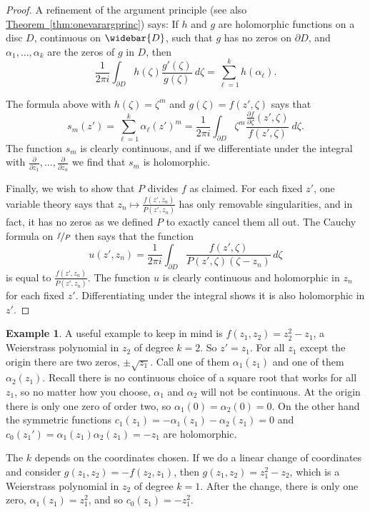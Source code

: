 \documentclass[12pt,openany]{book}
\theoremstyle{plain}
\theoremstyle{remark}
\theoremstyle{definition}
\theoremstyle{exercise}
\theoremstyle{example}
\newtheorem{example}[thm]{Example}
\newcommand{\thmref}[1]{\hyperref[#1]{Theorem~\ref*{#1}}}
\begin{document}
\begin{proof}
A refinement of the argument principle (see also \thmref{thm:onevarargprinc}) says:
If $h$ and $g$ are
holomorphic functions on a disc $D$, continuous on $\widebar{D}$,
such that $g$ has no zeros on $\partial D$, and $\alpha_1,\ldots,\alpha_k$
are the zeros of $g$ in $D$, then
\begin{equation*}
\frac{1}{2 \pi i}
\int_{\partial D} h(\zeta) \frac{g'(\zeta)}{g(\zeta)} ~d\zeta
= \sum_{\ell=1}^k h(\alpha_\ell) .
\end{equation*}

The formula above with $h(\zeta) = \zeta^m$ and $g(\zeta)=f(z',\zeta)$ says that
\begin{equation*}
s_m(z') =
\sum_{\ell=1}^k \alpha_\ell{(z')}^m
=
\frac{1}{2\pi i}
\int_{\partial D}
\zeta^m
\frac{\frac{\partial f}{\partial \zeta} (z',\zeta)}{f(z',\zeta)} ~d\zeta .
\end{equation*}
The function $s_m$ is clearly continuous, and if we
differentiate under the integral
with $\frac{\partial}{\partial\bar{z}_1}, \ldots, \frac{\partial}{\partial\bar{z}_n}$
we find that $s_m$
is holomorphic.

Finally, we wish to show that $P$ divides $f$ as claimed.
For each fixed $z'$, one variable theory says that
$z_n \mapsto \frac{f(z',z_n)}{P(z',z_n)}$ has only removable singularities,
and in fact, it has no zeros as we defined $P$
to exactly cancel them all out.
The Cauchy
formula on $\nicefrac{f}{P}$ then says that the function
\begin{equation*}
u(z',z_n) =
\frac{1}{2\pi i}
\int_{\partial D} \frac{f(z',\zeta)}{P(z',\zeta)(\zeta-z_n)} \,
d\zeta
\end{equation*}
is equal to $\frac{f(z',z_n)}{P(z',z_n)}$.
The function $u$ is clearly continuous and holomorphic in $z_n$
for each fixed $z'$.
Differentiating under the integral shows it is also holomorphic in $z'$.
\end{proof}

\begin{example} \label{sqrt:example}
A useful example to keep in mind is $f(z_1,z_2) = z_2^2 - z_1$,
a Weierstrass polynomial in $z_2$ of degree $k=2$.  So $z' = z_1$.
For all $z_1$ except the origin there are two zeros, $\pm \sqrt{z_1}$.
Call one of them $\alpha_1(z_1)$ and one of them $\alpha_2(z_1)$.  Recall
there is no continuous choice of a square root that works for all $z_1$,
so no matter how you choose, $\alpha_1$ and $\alpha_2$ will not be continuous.
At the origin there is only one zero of order two,
so $\alpha_1(0) = \alpha_2(0) = 0$.
On the other hand the
symmetric functions $c_1(z_1) = - \alpha_1(z_1) - \alpha_2(z_1) = 0$
and $c_0(z_1') = \alpha_1(z_1)\alpha_2(z_1) = -z_1$ are holomorphic.

The $k$ depends on the coordinates chosen.  If we do a
linear change of coordinates and consider $g(z_1,z_2) = -f(z_2,z_1)$,
then $g(z_1,z_2) = z_1^2 - z_2$,
which is a Weierstrass polynomial in $z_2$ of degree $k=1$.
After the change, there is only one zero,
$\alpha_1(z_1) = z_1^2$, and so $c_0(z_1) =
-z_1^2$.
\end{example}
\end{document}
